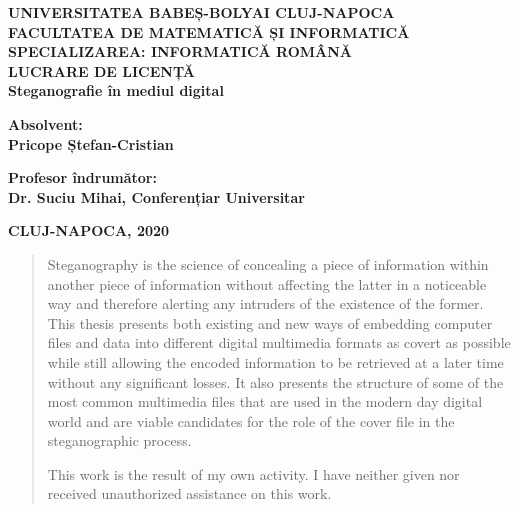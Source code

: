 \documentclass[notitlepage]{report}
\begin{document}
\begin{center}
        \vspace*{1cm}
        
        \LARGE
        \textbf{UNIVERSITATEA BABEȘ-BOLYAI CLUJ-NAPOCA \\ FACULTATEA DE MATEMATICĂ ȘI INFORMATICĂ \\ SPECIALIZAREA: INFORMATICĂ ROMÂNĂ}
        \vspace{1cm}\\

        \vfill
        \LARGE
        \textbf{LUCRARE DE LICENȚĂ} \\
	  \Large
	  \textbf{Steganografie în mediul digital}
        \vspace{1cm}

        
        \vfill
        
        \textbf{Absolvent:\\ Pricope Ștefan-Cristian}
        \vspace{0.1cm}

        \textbf{Profesor îndrumător:\\ Dr. Suciu Mihai, Conferențiar Universitar}\\
        \vspace{1cm}        

	  \Large
	  \textbf{CLUJ-NAPOCA, 2020}
        \vspace{0.3cm}
\end{center}


\clearpage
\begin{abstract}
Steganography is the science of concealing a piece of information within another piece of information without affecting the latter in a noticeable way and therefore alerting any intruders of the existence of the former. 
This thesis presents both existing and new ways of embedding computer files and data into different digital multimedia formats as covert as possible while still allowing the encoded information to be retrieved at a later time without any significant losses. It also       presents the structure of some of the most common multimedia files that are used in the modern day digital world and are viable candidates for the role of the cover file in the steganographic process.

This work is the result of my own activity. I have neither given nor received unauthorized assistance on this work.
\end{abstract}
\end{document}
